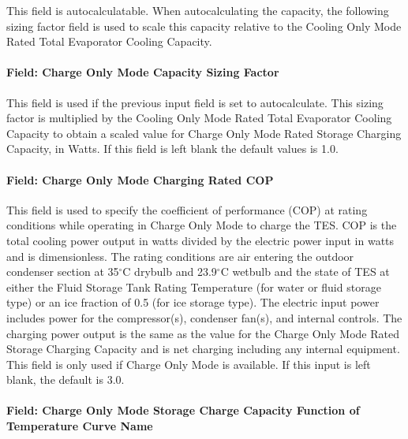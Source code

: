 This field is autocalculatable. When autocalculating the capacity, the following sizing factor field is used to scale this capacity relative to the Cooling Only Mode Rated Total Evaporator Cooling Capacity.

\paragraph{Field: Charge Only Mode Capacity Sizing Factor}\label{field-charge-only-mode-capacity-sizing-factor}

This field is used if the previous input field is set to autocalculate. This sizing factor is multiplied by the Cooling Only Mode Rated Total Evaporator Cooling Capacity to obtain a scaled value for Charge Only Mode Rated Storage Charging Capacity, in Watts. If this field is left blank the default values is 1.0.

\paragraph{Field: Charge Only Mode Charging Rated COP}\label{field-charge-only-mode-charging-rated-cop}

This field is used to specify the coefficient of performance (COP) at rating conditions while operating in Charge Only Mode to charge the TES. COP is the total cooling power output in watts divided by the electric power input in watts and is dimensionless. The rating conditions are air entering the outdoor condenser section at 35$^\circ$C drybulb and 23.9$^\circ$C wetbulb and the state of TES at either the Fluid Storage Tank Rating Temperature (for water or fluid storage type) or an ice fraction of 0.5 (for ice storage type). The electric input power includes power for the compressor(s), condenser fan(s), and internal controls. The charging power output is the same as the value for the Charge Only Mode Rated Storage Charging Capacity and is net charging including any internal equipment. This field is only used if Charge Only Mode is available. If this input is left blank, the default is 3.0.

\paragraph{Field: Charge Only Mode Storage Charge Capacity Function of Temperature Curve Name}\label{field-charge-only-mode-storage-charge-capacity-function-of-temperature-curve-name}

